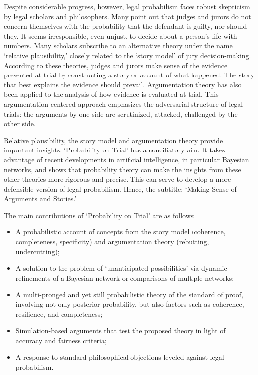 \documentclass[
  10pt,
  dvipsnames,enabledeprecatedfontcommands]{scrartcl}
\begin{document}
Despite considerable progress, however, legal probabilism faces robust
skepticism by legal scholars and philosophers. Many point out that
judges and jurors do not concern themselves with the probability that
the defendant is guilty, nor should they. It seems irresponsible, even
unjust, to decide about a person's life with numbers. Many scholars
subscribe to an alternative theory under the name `relative
plausibility,' closely related to the `story model' of jury
decision-making. According to these theories, judges and jurors make
sense of the evidence presented at trial by constructing a story or
account of what happened. The story that best explains the evidence
should prevail. Argumentation theory has also been applied to the
analysis of how evidence is evaluated at trial. This
argumentation-centered approach emphasizes the adversarial structure of
legal trials: the arguments by one side are scrutinized, attacked,
challenged by the other side.

Relative plausibility, the story model and argumentation theory provide
important insights. `Probability on Trial' has a conciliatory aim. It
takes advantage of recent developments in artificial intelligence, in
particular Bayesian networks, and shows that probability theory can make
the insights from these other theories more rigorous and precise. This
can serve to develop a more defensible version of legal probabilism.
Hence, the subtitle: `Making Sense of Arguments and Stories.'

The main contributions of `Probability on Trial' are as follows:

\begin{itemize}
\item A probabilistic account of concepts from the story model (coherence, completeness, specificity) and argumentation theory (rebutting, undercutting);
\item A solution to the problem of `unanticipated possibilities'  via dynamic refinements of a Bayesian network or comparisons of multiple networks;
\item A multi-pronged and yet still probabilistic theory of the standard of proof, involving not only posterior probability, but also  factors such as  coherence, resilience, and completeness;
\item Simulation-based arguments that test the proposed theory in light of accuracy and fairness criteria;
\item A response to standard philosophical objections leveled against legal probabilism.
\end{itemize}
\end{document}
